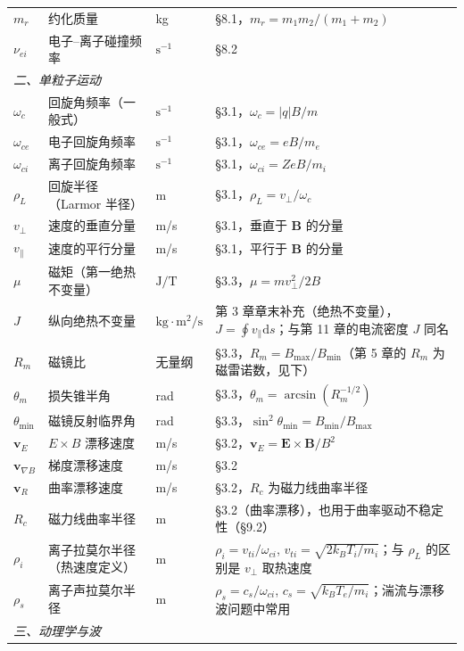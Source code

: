 \documentclass[12pt,a4paper,openany,oneside]{book}
\newcommand{\diff}{\mathrm{d}}
\newcommand{\vect}[1]{\bm{#1}}
\begin{document}
{\begin{longtable}{@{}p{1.8cm}p{4.4cm}p{3.3cm}p{5.1cm}@{}}
$m_r$ & 约化质量 & kg & \S 8.1，$m_r = m_1m_2/(m_1+m_2)$ \\
$\nu_{ei}$ & 电子--离子碰撞频率 & $\mathrm{s^{-1}}$ & \S 8.2 \\
\multicolumn{4}{l}{\textit{二、单粒子运动}} \\
\midrule
$\omega_c$ & 回旋角频率（一般式） & $\mathrm{s^{-1}}$ & \S 3.1，$\omega_c = |q|B/m$ \\
$\omega_{ce}$ & 电子回旋角频率 & $\mathrm{s^{-1}}$ & \S 3.1，$\omega_{ce} = eB/m_e$ \\
$\omega_{ci}$ & 离子回旋角频率 & $\mathrm{s^{-1}}$ & \S 3.1，$\omega_{ci} = ZeB/m_i$ \\
$\rho_L$ & 回旋半径（Larmor 半径） & m & \S 3.1，$\rho_L = v_\perp/\omega_c$ \\
$v_\perp$ & 速度的垂直分量 & m/s & \S 3.1，垂直于 $\vect{B}$ 的分量 \\
$v_\parallel$ & 速度的平行分量 & m/s & \S 3.1，平行于 $\vect{B}$ 的分量 \\
$\mu$ & 磁矩（第一绝热不变量） & $\mathrm{J/T}$ & \S 3.3，$\mu = mv_\perp^2/2B$ \\
$J$ & 纵向绝热不变量 & $\mathrm{kg\cdot m^2/s}$ & 第 3 章章末补充（绝热不变量），$J = \oint v_\parallel\diff s$；与第 11 章的电流密度 $J$ 同名 \\
$R_m$ & 磁镜比 & 无量纲 & \S 3.3，$R_m = B_{\max}/B_{\min}$（第 5 章的 $R_m$ 为磁雷诺数，见下） \\
$\theta_m$ & 损失锥半角 & rad & \S 3.3，$\theta_m = \arcsin(R_m^{-1/2})$ \\
$\theta_{\min}$ & 磁镜反射临界角 & rad & \S 3.3，$\sin^2\theta_{\min} = B_{\min}/B_{\max}$ \\
$\vect{v}_E$ & $E\times B$ 漂移速度 & m/s & \S 3.2，$\vect{v}_E = \vect{E}\times\vect{B}/B^2$ \\
$\vect{v}_{\nabla B}$ & 梯度漂移速度 & m/s & \S 3.2 \\
$\vect{v}_R$ & 曲率漂移速度 & m/s & \S 3.2，$R_c$ 为磁力线曲率半径 \\
$R_c$ & 磁力线曲率半径 & m & \S 3.2（曲率漂移），也用于曲率驱动不稳定性（\S 9.2） \\
$\rho_i$ & 离子拉莫尔半径（热速度定义） & m & $\rho_i = v_{ti}/\omega_{ci}$, $v_{ti}=\sqrt{2k_{B}T_i/m_i}$；与 $\rho_L$ 的区别是 $v_\perp$ 取热速度 \\
$\rho_s$ & 离子声拉莫尔半径 & m & $\rho_s = c_s/\omega_{ci}$, $c_s=\sqrt{k_{B}T_e/m_i}$；湍流与漂移波问题中常用 \\
\multicolumn{4}{l}{\textit{三、动理学与波}} \\

\end{longtable}}
\end{document}

